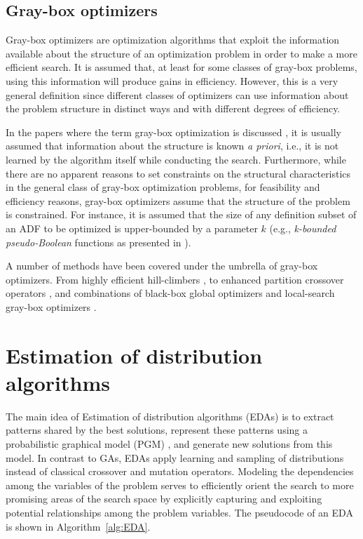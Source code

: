 \documentclass{article} %
\begin{document}
 
\subsection{Gray-box optimizers}
 
 Gray-box optimizers  are optimization algorithms that exploit the information available about the structure of an optimization problem in order to make a more efficient search.  It is assumed that, at least for some classes of gray-box problems, using this information will produce gains in efficiency.  However, this is a very general definition since different classes of optimizers can use information about the problem structure in distinct ways and with different degrees of efficiency. 

  In the papers where the term gray-box optimization is discussed  \cite{Chicano_et_2014,Chicano_et_al:2016,Tinos_et_al:2015,Whitley_et_al:2013},  it is usually assumed that information about the structure is known \emph{a priori}, i.e., it is not learned by the algorithm itself while conducting the search. Furthermore,  while there are no apparent reasons to set constraints on the structural characteristics  in the general class of gray-box optimization problems, for feasibility and efficiency reasons, gray-box optimizers assume that the  structure of the problem is constrained. For instance, it is assumed that the size of any definition subset of an ADF to be optimized is upper-bounded by a parameter $k$ (e.g.,  \emph{k-bounded pseudo-Boolean} functions as presented in \cite{Whitley:2015}).
 

  A number of methods have been covered under the umbrella of gray-box optimizers. From highly efficient hill-climbers \cite{Chicano_et_al:2016,Whitley_et_al:2013}, to enhanced partition crossover operators \cite{Chicano_et_2014,Tinos_et_al:2015},  and combinations of black-box global optimizers and local-search gray-box optimizers \cite{Goldman_et_al:2015}. 
 



  
\section{Estimation of distribution algorithms} \label{sec:EDA_BG}
  
The main idea of Estimation of distribution algorithms (EDAs) \cite{Larranaga_et_al:2012,Lozano_et_al:2005,Muhlenbein_and_Paas:1996r}  is to extract patterns shared by the best solutions, represent these patterns using a probabilistic graphical model (PGM) \cite{Koller_and_Friedman:2009,Pearl:2000}, and generate new solutions from this model. In contrast to GAs, EDAs apply learning and sampling of distributions instead of classical crossover and mutation operators. Modeling the dependencies among the variables of the problem serves to efficiently orient the search to more promising areas of the search space by explicitly capturing and exploiting potential relationships among the problem variables.  The pseudocode of an EDA is shown in Algorithm~\ref{alg:EDA}.
\end{document}

